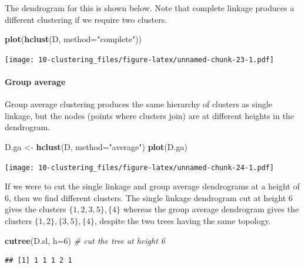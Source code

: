\documentclass[
]{book}
\newenvironment{Shaded}{\begin{snugshade}}{\end{snugshade}}
\newcommand{\AttributeTok}[1]{\textcolor[rgb]{0.13,0.29,0.53}{#1}}
\newcommand{\CommentTok}[1]{\textcolor[rgb]{0.56,0.35,0.01}{\textit{#1}}}
\newcommand{\DecValTok}[1]{\textcolor[rgb]{0.00,0.00,0.81}{#1}}
\newcommand{\FunctionTok}[1]{\textcolor[rgb]{0.13,0.29,0.53}{\textbf{#1}}}
\newcommand{\NormalTok}[1]{#1}
\newcommand{\OtherTok}[1]{\textcolor[rgb]{0.56,0.35,0.01}{#1}}
\newcommand{\StringTok}[1]{\textcolor[rgb]{0.31,0.60,0.02}{#1}}
\theoremstyle{definition}
\theoremstyle{definition}
\theoremstyle{definition}
\theoremstyle{definition}
\theoremstyle{remark}
\begin{document}
The dendrogram for this is shown below. Note that complete linkage produces a different clustering if we require two clusters.

\begin{Shaded}
\begin{Highlighting}[]
\FunctionTok{plot}\NormalTok{(}\FunctionTok{hclust}\NormalTok{(D, }\AttributeTok{method=}\StringTok{"complete"}\NormalTok{))}
\end{Highlighting}
\end{Shaded}

\texttt{[image: 10-clustering\_files/figure-latex/unnamed-chunk-23-1.pdf]}

\paragraph*{Group average}\label{group-average}

Group average clustering produces the same hierarchy of clusters as single linkage, but the nodes (points where clusters join) are at different heights in the dendrogram.

\begin{Shaded}
\begin{Highlighting}[]
\NormalTok{D.ga }\OtherTok{\textless{}{-}} \FunctionTok{hclust}\NormalTok{(D, }\AttributeTok{method=}\StringTok{"average"}\NormalTok{)}
\FunctionTok{plot}\NormalTok{(D.ga)}
\end{Highlighting}
\end{Shaded}

\texttt{[image: 10-clustering\_files/figure-latex/unnamed-chunk-24-1.pdf]}

If we were to cut the single linkage and group average dendrograms at a height of 6, then we find different clusters. The single linkage dendrogram cut at height 6 gives the clusters \(\{1,2,3,5\}, \{4\}\) whereas the group average dendrogram gives the clusters \(\{1,2\}, \{3,5\}, \{4\}\), despite the two trees having the same topology.

\begin{Shaded}
\begin{Highlighting}[]
\FunctionTok{cutree}\NormalTok{(D.sl, }\AttributeTok{h=}\DecValTok{6}\NormalTok{) }\CommentTok{\# cut the tree at height 6}
\end{Highlighting}
\end{Shaded}

\begin{verbatim}
## [1] 1 1 1 2 1
\end{verbatim}
\end{document}
